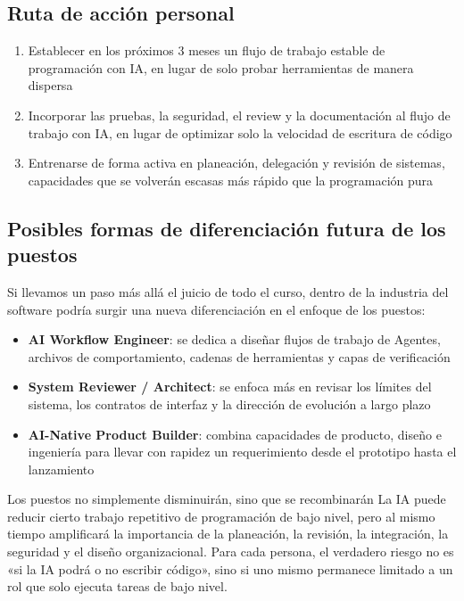\subsection{Ruta de acción personal}

\begin{enumerate}
    \item Establecer en los próximos 3 meses un flujo de trabajo estable de programación con IA, en lugar de solo probar herramientas de manera dispersa
    \item Incorporar las pruebas, la seguridad, el review y la documentación al flujo de trabajo con IA, en lugar de optimizar solo la velocidad de escritura de código
    \item Entrenarse de forma activa en planeación, delegación y revisión de sistemas, capacidades que se volverán escasas más rápido que la programación pura
\end{enumerate}

\subsection{Posibles formas de diferenciación futura de los puestos}

Si llevamos un paso más allá el juicio de todo el curso, dentro de la industria del software podría surgir una nueva diferenciación en el enfoque de los puestos:

\begin{itemize}
    \item \textbf{AI Workflow Engineer}: se dedica a diseñar flujos de trabajo de Agentes, archivos de comportamiento, cadenas de herramientas y capas de verificación
    \item \textbf{System Reviewer / Architect}: se enfoca más en revisar los límites del sistema, los contratos de interfaz y la dirección de evolución a largo plazo
    \item \textbf{AI-Native Product Builder}: combina capacidades de producto, diseño e ingeniería para llevar con rapidez un requerimiento desde el prototipo hasta el lanzamiento
\end{itemize}

\begin{warningbox}{Los puestos no simplemente disminuirán, sino que se recombinarán}
La IA puede reducir cierto trabajo repetitivo de programación de bajo nivel, pero al mismo tiempo amplificará la importancia de la planeación, la revisión, la integración, la seguridad y el diseño organizacional. Para cada persona, el verdadero riesgo no es «si la IA podrá o no escribir código», sino si uno mismo permanece limitado a un rol que solo ejecuta tareas de bajo nivel.
\end{warningbox}

